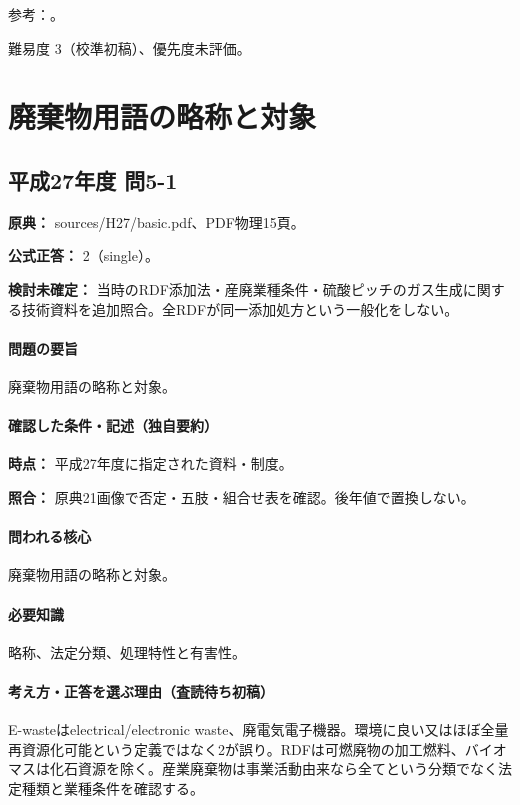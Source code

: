 \par 参考：\cite{env_circular_law,env58_wastegoal}。

\par 難易度 3（校準初稿）、優先度未評価。

\section{廃棄物用語の略称と対象}

\subsection{平成27年度 問5-1}
\label{q:h27-reg-basic-5-1}

\noindent\textbf{原典：} sources/H27/basic.pdf、PDF物理15頁。

\textbf{公式正答：} 2（single）。

\par\textbf{検討未確定：} 当時のRDF添加法・産廃業種条件・硫酸ピッチのガス生成に関する技術資料を追加照合。全RDFが同一添加処方という一般化をしない。

\paragraph{問題の要旨} 廃棄物用語の略称と対象。

\paragraph{確認した条件・記述（独自要約）}\mbox{}\par

\noindent\textbf{時点：} 平成27年度に指定された資料・制度。\par

\noindent\textbf{照合：} 原典21画像で否定・五肢・組合せ表を確認。後年値で置換しない。\par

\paragraph{問われる核心} 廃棄物用語の略称と対象。

\paragraph{必要知識} 略称、法定分類、処理特性と有害性。

\paragraph{考え方・正答を選ぶ理由（査読待ち初稿）} E-wasteはelectrical/electronic waste、廃電気電子機器。環境に良い又はほぼ全量再資源化可能という定義ではなく2が誤り。RDFは可燃廃物の加工燃料、バイオマスは化石資源を除く。産業廃棄物は事業活動由来なら全てという分類でなく法定種類と業種条件を確認する。

